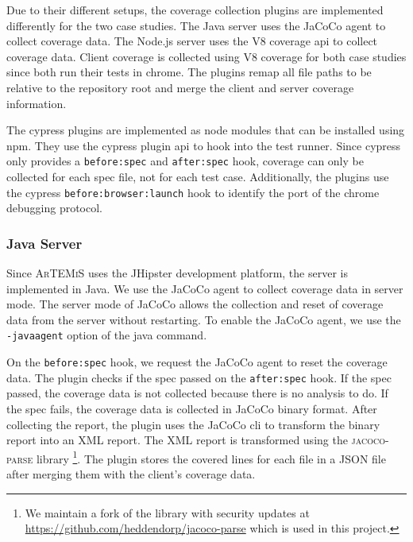 Due to their different setups, the coverage collection plugins are implemented differently for the two case studies.
The Java server uses the JaCoCo agent to collect coverage data.
The Node.js server uses the V8 coverage \ac{api} to collect coverage data.
Client coverage is collected using V8 coverage for both case studies since both run their tests in chrome.
The plugins remap all file paths to be relative to the repository root and merge the client and server coverage information.

The cypress plugins are implemented as node modules that can be installed using npm.
They use the cypress plugin \ac{api} \autocite{cypressio_writing_nodate} to hook into the test runner.
Since cypress only provides a \texttt{before:spec} and \texttt{after:spec} hook, coverage can only be collected for each spec file, not for each test case.
Additionally, the plugins use the cypress \texttt{before:browser:launch} hook to identify the port of the chrome debugging protocol.
\subsubsection{Java Server}
Since \textsc{ArTEMiS} uses the JHipster \autocite{jhipster_jhipster_nodate} development platform, the server is implemented in Java.
We use the JaCoCo agent \autocite{noauthor_jacoco_nodate} to collect coverage data in server mode.
The server mode of JaCoCo allows the collection and reset of coverage data from the server without restarting.
To enable the JaCoCo agent, we use the \texttt{-javaagent} option of the java command.

On the \texttt{before:spec} hook, we request the JaCoCo agent to reset the coverage data.
The plugin checks if the spec passed on the \texttt{after:spec} hook.
If the spec passed, the coverage data is not collected because there is no analysis to do.
If the spec fails, the coverage data is collected in JaCoCo binary format.
After collecting the report, the plugin uses the JaCoCo \ac{cli} to transform the binary report into an XML report.
The XML report is transformed using the \textsc{jacoco-parse} library \autocite{noauthor_jacoco-parse_2023}\footnote{We maintain a fork of the library with security updates at \url{https://github.com/heddendorp/jacoco-parse} which is used in this project.}.
The plugin stores the covered lines for each file in a JSON file after merging them with the client's coverage data.

